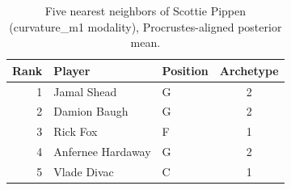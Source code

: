 \begin{table}[htbp]
  \centering\small
  \begin{tabular}{rllc}
    \toprule
    Rank & Player & Position & Archetype \\
    \midrule
    1 & Jamal Shead & G & 2 \\
    2 & Damion Baugh & G & 2 \\
    3 & Rick Fox & F & 1 \\
    4 & Anfernee Hardaway & G & 2 \\
    5 & Vlade Divac & C & 1 \\
    \bottomrule
  \end{tabular}
  \caption{Five nearest neighbors of Scottie Pippen (curvature_m1 modality), Procrustes-aligned posterior mean.}
  \label{tab:Scottie_Pippen_neighbors_curvature_m1}
\end{table}


